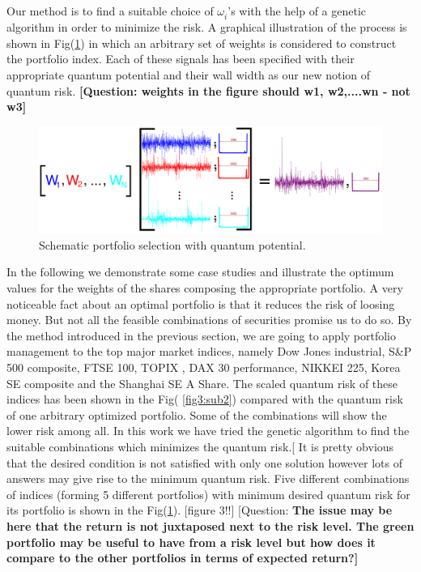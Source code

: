 \documentclass[ aip,jmp,reprint]{revtex4-2}
\begin{document}
Our method is to find a suitable choice of $\omega _{i}^{{}}$'s with the
help of a genetic algorithm in order to minimize the risk. A graphical
illustration of the process is shown in Fig(\ref{fig:2}) in which an
arbitrary set of weights is considered to construct the portfolio index.
Each of these signals has been specified with their appropriate quantum
potential and their wall width as our new notion of quantum risk. \textbf{%
[Question: weights in the figure should w1, w2,....wn - not w3]}\newline
\begin{figure}[tbh]
\centering
\includegraphics[width=120mm]{new1_fig0.png}
\caption{Schematic portfolio selection with quantum potential.}
\label{fig:2}
\end{figure}
\newpage In the following we demonstrate some case studies and illustrate
the optimum values for the weights of the shares composing the appropriate
portfolio. A very noticeable fact about an optimal portfolio is that it
reduces the risk of loosing money. But not all the feasible combinations of
securities promise us to do so. By the method introduced in the previous
section, we are going to apply portfolio management to the top major market
indices, namely Dow Jones industrial, S\&P 500 composite, FTSE 100, TOPIX ,
DAX 30 performance, NIKKEI 225, Korea SE composite and the Shanghai SE A
Share. The scaled quantum risk of these indices has been shown in the Fig(%
\ref{fig3:sub2}) compared with the quantum risk of one arbitrary optimized
portfolio. Some of the combinations will show the lower risk among all. In
this work we have tried the genetic algorithm to find the suitable
combinations which minimizes the quantum risk.[  It is pretty obvious that
the desired condition is not satisfied with only one solution however lots
of answers may give rise to the minimum quantum risk. Five different
combinations of indices (forming 5 different portfolios) with minimum
desired quantum risk for its portfolio is shown in the Fig(\ref{fig:2}).
[figure 3!!] [Question: \textbf{The issue may be here that the return is not
juxtaposed next to the risk level. The green portfolio may be useful to have
from a risk level but how does it compare to the other portfolios in terms
of expected return?] }
\end{document}
